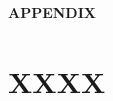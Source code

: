 \documentclass[12pt]{article}
\begin{document}
\appendix
\renewcommand{\thefigure}{A\arabic{figure}}
\renewcommand{\thetable}{A\arabic{table}}
\renewcommand{\theequation}{A\arabic{equation}}

\setcounter{figure}{0}
\setcounter{table}{0}

%


\newpage
{}
\recalctypearea

\newpage
\begin{center}
    \textbf{APPENDIX}
\end{center}

\section{XXXX}
\end{document}

